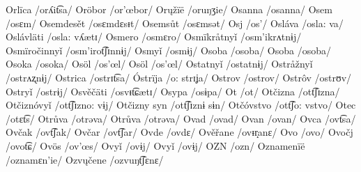 Orlïca /orʎit͡sa/
Oröbor /or’œbor/
Orųžïë /oruŋʒie/
Osanna /osanna/
Osem /osɛm/
Osemdesět /osɛmdɛsᵻt/
Osemsůt /osɛmsət/
Osj /os’/
Osláva /osla: va/
Oslávläti /osla: vʎætɪ/
Osmero /osmɛro/
Osmïkråtnyǐ /osm’ikrʌtnɨj/
Osmïročinnyǐ /osm’irot͡ʃɪnnɨj/
Osmyǐ /osmɨj/
Osoba /osoba/
Osoba /osoba/
Osoka /osoka/
Osöl /os’œl/
Osöl /os’œl/
Ostatnyǐ /ostatnɨj/
Ostråžnyǐ /ostrʌʐnɨj/
Ostrica /ostrɪt͡sa/
Óstrïja /o: strɪʝa/
Ostrov /ostrov/
Ostrôv /ostrʊv/
Ostryǐ /ostrɨj/
Osvěčäti /osvᵻt͡ɕætɪ/
Osypa /osɨpa/
Ot /ot/
Otčizna /ott͡ʃɪzna/
Otčiznóvyǐ /ott͡ʃɪzno: vɨj/
Otčizny syn /ott͡ʃɪznɨ sɨn/
Otčóvstvo /ott͡ʃo: vstvo/
Otec /otɛt͡s/
Otrůva /otrəva/
Otrůva /otrəva/
Ovad /ovad/
Ovan /ovan/
Ovca /ovt͡sa/
Ovčak /ovt͡ʃak/
Ovčar /ovt͡ʃar/
Ovde /ovdɛ/
Ověřane /ovᵻr̝anɛ/
Ovo /ovo/
Ovočj /ovot͡ɕ/
Ovös /ov’œs/
Ovyǐ /ovɨj/
Ovyǐ /ovɨj/
OZN /ozn/
Oznamenïë /oznamɛn’ie/
Ozvųčene /ozvuŋt͡ʃɛnɛ/